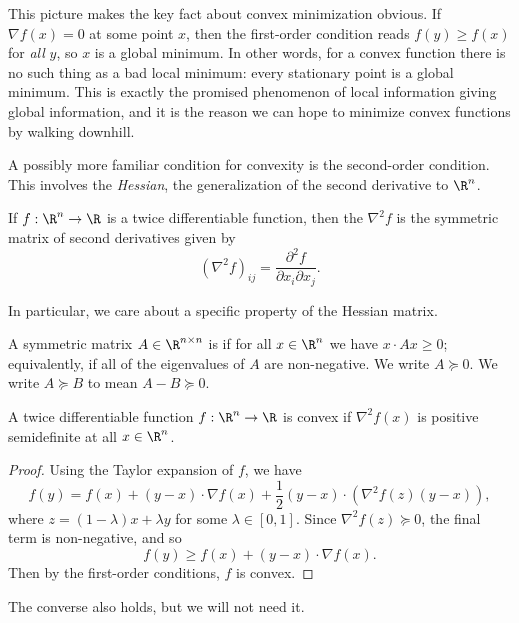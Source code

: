This picture makes the key fact about convex minimization obvious. If $\nabla f(x) = 0$ at some point $x$, then the first-order condition reads $f(y) \geq f(x)$ for \emph{all} $y$, so $x$ is a global minimum. In other words, for a convex function there is no such thing as a bad local minimum: every stationary point is a global minimum. This is exactly the promised phenomenon of local information giving global information, and it is the reason we can hope to minimize convex functions by walking downhill.

A possibly more familiar condition for convexity is the second-order condition. This involves the \emph{Hessian}, the generalization of the second derivative to $\R^n$.

\begin{definition}[Hessian]
    If $f: \R^n \rightarrow \R$ is a twice differentiable function, then the  $\nabla^2 f$ is the symmetric matrix of second derivatives given by
    $$
    (\nabla^2 f)_{ij} = \frac{\partial^2 f}{\partial x_i \partial x_j}.
    $$
\end{definition}

In particular, we care about a specific property of the Hessian matrix.

\begin{definition}
    A symmetric matrix $A \in \R^{n \times n}$ is  if for all $x \in \R^n$ we have $x \cdot Ax \geq 0$; equivalently, if all of the eigenvalues of $A$ are non-negative. We write $A \succeq 0$. We write $A \succeq B$ to mean $A - B \succeq 0$.
\end{definition}

\begin{proposition}
A twice differentiable function $f:\R^n \rightarrow \R$ is convex if $\nabla^2 f(x)$ is positive semidefinite at all $x \in \R^n$.
\end{proposition}
\begin{proof}
    Using the Taylor expansion of $f$, we have
    $$
f(y) = f(x) + (y - x) \cdot \nabla f(x) + \frac{1}{2}(y - x) \cdot ( \nabla^2f(z)(y - x)),
    $$
    where $z = (1 - \lambda)x + \lambda y$ for some $\lambda \in [0, 1]$. Since $\nabla^2 f(z) \succeq 0$, the final term is non-negative, and so
    $$
    f(y) \geq f(x) + (y-x) \cdot \nabla f(x).
    $$
    Then by the first-order conditions, $f$ is convex.
\end{proof}

The converse also holds, but we will not need it.

